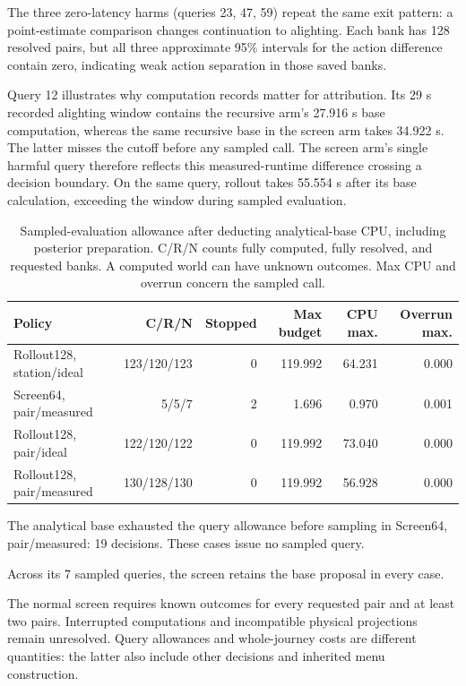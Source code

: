 \documentclass[preprint,12pt,authoryear]{elsarticle}
\begin{document}
The three zero-latency harms (queries 23, 47, 59) repeat the same exit pattern: a point-estimate comparison changes continuation to alighting. Each bank has 128 resolved pairs, but all three approximate 95\% intervals for the action difference contain zero, indicating weak action separation in those saved banks.

Query 12 illustrates why computation records matter for attribution. Its 29 s recorded alighting window contains the recursive arm's 27.916 s base computation, whereas the same recursive base in the screen arm takes 34.922 s. The latter misses the cutoff before any sampled call. The screen arm's single harmful query therefore reflects this measured-runtime difference crossing a decision boundary. On the same query, rollout takes 55.554 s after its base calculation, exceeding the window during sampled evaluation.

\begin{table}[ht]
\centering\small\setlength{\tabcolsep}{4pt}
\caption{Sampled-evaluation allowance after deducting analytical-base CPU, including posterior preparation. C/R/N counts fully computed, fully resolved, and requested banks. A computed world can have unknown outcomes. Max CPU and overrun concern the sampled call.}
\begin{tabular}{p{}rrrrr}
\toprule
Policy & C/R/N & Stopped & Max budget & CPU max. & Overrun max. \\
\midrule
Rollout128, station/ideal & 123/120/123 & 0 & 119.992 & 64.231 & 0.000 \\
Screen64, pair/measured & 5/5/7 & 2 & 1.696 & 0.970 & 0.001 \\
Rollout128, pair/ideal & 122/120/122 & 0 & 119.992 & 73.040 & 0.000 \\
Rollout128, pair/measured & 130/128/130 & 0 & 119.992 & 56.928 & 0.000 \\
\bottomrule
\end{tabular}
\end{table}

The analytical base exhausted the query allowance before sampling in Screen64, pair/measured: 19 decisions. These cases issue no sampled query.

Across its 7 sampled queries, the screen retains the base proposal in every case.

The normal screen requires known outcomes for every requested pair and at least two pairs. Interrupted computations and incompatible physical projections remain unresolved. Query allowances and whole-journey costs are different quantities: the latter also include other decisions and inherited menu construction.
\end{document}
